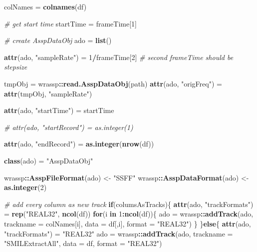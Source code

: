 \documentclass[]{book}
\newenvironment{Shaded}{\begin{snugshade}}{\end{snugshade}}
\newcommand{\CommentTok}[1]{\textcolor[rgb]{0.56,0.35,0.01}{\textit{#1}}}
\newcommand{\ControlFlowTok}[1]{\textcolor[rgb]{0.13,0.29,0.53}{\textbf{#1}}}
\newcommand{\DataTypeTok}[1]{\textcolor[rgb]{0.13,0.29,0.53}{#1}}
\newcommand{\DecValTok}[1]{\textcolor[rgb]{0.00,0.00,0.81}{#1}}
\newcommand{\KeywordTok}[1]{\textcolor[rgb]{0.13,0.29,0.53}{\textbf{#1}}}
\newcommand{\NormalTok}[1]{#1}
\newcommand{\OperatorTok}[1]{\textcolor[rgb]{0.81,0.36,0.00}{\textbf{#1}}}
\newcommand{\StringTok}[1]{\textcolor[rgb]{0.31,0.60,0.02}{#1}}
\begin{document}
\begin{Shaded}
\begin{Highlighting}[]
\NormalTok{  colNames =}\StringTok{ }\KeywordTok{colnames}\NormalTok{(df)}

  \CommentTok{# get start time}
\NormalTok{  startTime =}\StringTok{ }\NormalTok{frameTime[}\DecValTok{1}\NormalTok{]}

  \CommentTok{# create AsspDataObj}
\NormalTok{  ado =}\StringTok{ }\KeywordTok{list}\NormalTok{()}

  \KeywordTok{attr}\NormalTok{(ado, }\StringTok{"sampleRate"}\NormalTok{) =}\StringTok{ }\DecValTok{1}\OperatorTok{/}\NormalTok{frameTime[}\DecValTok{2}\NormalTok{] }\CommentTok{# second frameTime should be stepsize}

\NormalTok{  tmpObj =}\StringTok{ }\NormalTok{wrassp}\OperatorTok{::}\KeywordTok{read.AsspDataObj}\NormalTok{(path)}
  \KeywordTok{attr}\NormalTok{(ado, }\StringTok{"origFreq"}\NormalTok{) =}\StringTok{ }\KeywordTok{attr}\NormalTok{(tmpObj, }\StringTok{"sampleRate"}\NormalTok{)}

  \KeywordTok{attr}\NormalTok{(ado, }\StringTok{"startTime"}\NormalTok{) =}\StringTok{ }\NormalTok{startTime}

  \CommentTok{# attr(ado, "startRecord") = as.integer(1)}

  \KeywordTok{attr}\NormalTok{(ado, }\StringTok{"endRecord"}\NormalTok{) =}\StringTok{ }\KeywordTok{as.integer}\NormalTok{(}\KeywordTok{nrow}\NormalTok{(df))}

  \KeywordTok{class}\NormalTok{(ado) =}\StringTok{ "AsspDataObj"}

\NormalTok{  wrassp}\OperatorTok{::}\KeywordTok{AsspFileFormat}\NormalTok{(ado) <-}\StringTok{ "SSFF"}
\NormalTok{  wrassp}\OperatorTok{::}\KeywordTok{AsspDataFormat}\NormalTok{(ado) <-}\StringTok{ }\KeywordTok{as.integer}\NormalTok{(}\DecValTok{2}\NormalTok{)}

  \CommentTok{# add every column as new track}
  \ControlFlowTok{if}\NormalTok{(columsAsTracks)\{}
    \KeywordTok{attr}\NormalTok{(ado, }\StringTok{"trackFormats"}\NormalTok{) =}\StringTok{ }\KeywordTok{rep}\NormalTok{(}\StringTok{"REAL32"}\NormalTok{, }\KeywordTok{ncol}\NormalTok{(df))}
    \ControlFlowTok{for}\NormalTok{(i }\ControlFlowTok{in} \DecValTok{1}\OperatorTok{:}\KeywordTok{ncol}\NormalTok{(df))\{}
\NormalTok{      ado =}\StringTok{ }\NormalTok{wrassp}\OperatorTok{::}\KeywordTok{addTrack}\NormalTok{(ado,}
                             \DataTypeTok{trackname =}\NormalTok{ colNames[i],}
                             \DataTypeTok{data =}\NormalTok{ df[,i],}
                             \DataTypeTok{format =} \StringTok{"REAL32"}\NormalTok{)}
\NormalTok{    \}}
\NormalTok{  \}}\ControlFlowTok{else}\NormalTok{\{}
    \KeywordTok{attr}\NormalTok{(ado, }\StringTok{"trackFormats"}\NormalTok{) =}\StringTok{ "REAL32"}
\NormalTok{    ado =}\StringTok{ }\NormalTok{wrassp}\OperatorTok{::}\KeywordTok{addTrack}\NormalTok{(ado,}
                           \DataTypeTok{trackname =} \StringTok{"SMILExtractAll"}\NormalTok{,}
                           \DataTypeTok{data =}\NormalTok{ df,}
                           \DataTypeTok{format =} \StringTok{"REAL32"}\NormalTok{)}


\end{Highlighting}
\end{Shaded}
\end{document}
